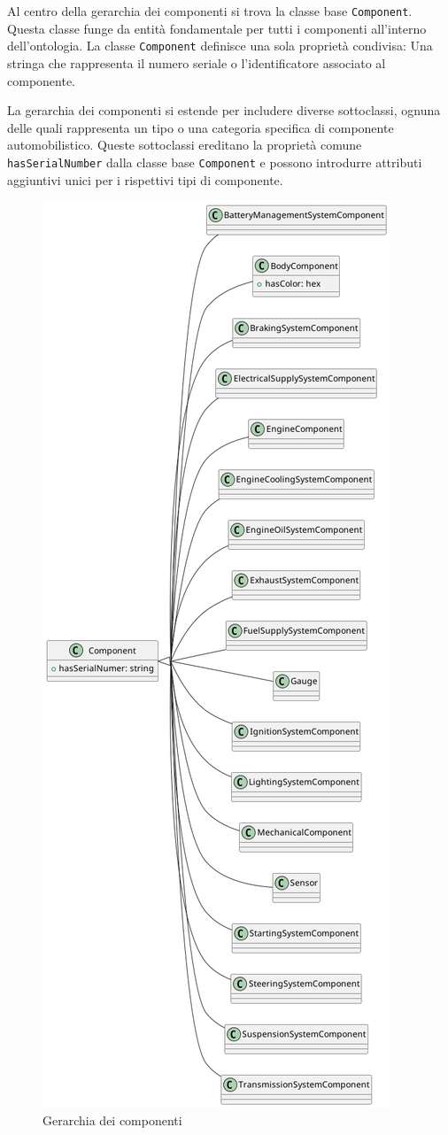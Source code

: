 Al centro della gerarchia dei componenti si trova la classe base \texttt{Component}. Questa classe funge da entità fondamentale per tutti i componenti all'interno dell'ontologia. La classe \texttt{Component} definisce una sola proprietà condivisa: Una stringa che rappresenta il numero seriale o l'identificatore associato al componente.

La gerarchia dei componenti si estende per includere diverse sottoclassi, ognuna delle quali rappresenta un tipo o una categoria specifica di componente automobilistico. Queste sottoclassi ereditano la proprietà comune \texttt{hasSerialNumber} dalla classe base \texttt{Component} e possono introdurre attributi aggiuntivi unici per i rispettivi tipi di componente.

\begin{figure}
    \caption{Gerarchia dei componenti}
    \includegraphics[height=\textheight]{figures/carpedia-component.png}

\end{figure}
